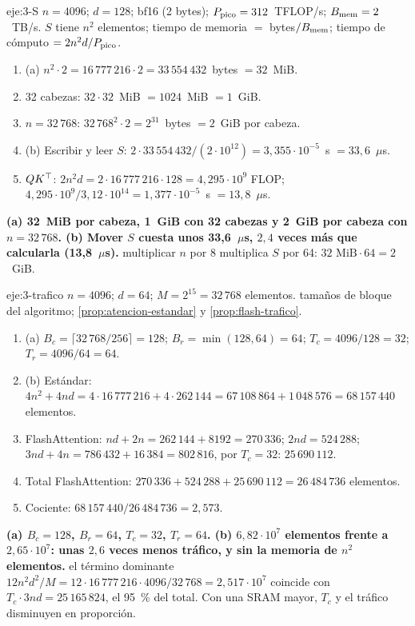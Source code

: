 \begin{solucion}{eje:3-S}
\datos $n=4096$; $d=128$; bf16 (2 bytes); $P_{\mathrm{pico}}=312$~TFLOP/s; $B_{\mathrm{mem}}=2$~TB/s.
\planteamiento $S$ tiene $n^{2}$ elementos; tiempo de memoria $=$ bytes$/B_{\mathrm{mem}}$; tiempo de cómputo $=2n^{2}d/P_{\mathrm{pico}}$.
\pasos
\begin{enumerate}[label=\arabic*.]
  \item (a) $n^{2}\cdot 2=16\,777\,216\cdot 2=33\,554\,432$~bytes $=32$~MiB.
  \item 32 cabezas: $32\cdot 32$~MiB $=1024$~MiB $=1$~GiB.
  \item $n=32\,768$: $32\,768^{2}\cdot 2=2^{31}$~bytes $=2$~GiB por cabeza.
  \item (b) Escribir y leer $S$: $2\cdot 33\,554\,432/(2\cdot 10^{12})=3{,}355\cdot 10^{-5}$~s $=33{,}6$~$\mu$s.
  \item $QK^{\top}$: $2n^{2}d=2\cdot 16\,777\,216\cdot 128=4{,}295\cdot 10^{9}$ FLOP; $4{,}295\cdot 10^{9}/3{,}12\cdot 10^{14}=1{,}377\cdot 10^{-5}$~s $=13{,}8$~$\mu$s.
\end{enumerate}
\resultado \textbf{(a) 32~MiB por cabeza, 1~GiB con 32 cabezas y 2~GiB por cabeza con $n=32\,768$. (b) Mover $S$ cuesta unos 33{,}6~$\mu$s, $2{,}4$ veces más que calcularla (13{,}8~$\mu$s).}
\comprobacion multiplicar $n$ por 8 multiplica $S$ por 64: $32\text{ MiB}\cdot 64=2$~GiB.
\end{solucion}

\begin{solucion}{eje:3-trafico}
\datos $n=4096$; $d=64$; $M=2^{15}=32\,768$ elementos.
\planteamiento tamaños de bloque del algoritmo; \cref{prop:atencion-estandar} y \cref{prop:flash-trafico}.
\pasos
\begin{enumerate}[label=\arabic*.]
  \item (a) $B_c=\lceil 32\,768/256\rceil=128$; $B_r=\min(128,64)=64$; $T_c=4096/128=32$; $T_r=4096/64=64$.
  \item (b) Estándar: $4n^{2}+4nd=4\cdot 16\,777\,216+4\cdot 262\,144=67\,108\,864+1\,048\,576=68\,157\,440$ elementos.
  \item FlashAttention: $nd+2n=262\,144+8192=270\,336$; $2nd=524\,288$; $3nd+4n=786\,432+16\,384=802\,816$, por $T_c=32$: $25\,690\,112$.
  \item Total FlashAttention: $270\,336+524\,288+25\,690\,112=26\,484\,736$ elementos.
  \item Cociente: $68\,157\,440/26\,484\,736=2{,}573$.
\end{enumerate}
\resultado \textbf{(a) $B_c=128$, $B_r=64$, $T_c=32$, $T_r=64$. (b) $6{,}82\cdot 10^{7}$ elementos frente a $2{,}65\cdot 10^{7}$: unas $2{,}6$ veces menos tráfico, y sin la memoria de $n^{2}$ elementos.}
\comprobacion el término dominante $12n^{2}d^{2}/M=12\cdot 16\,777\,216\cdot 4096/32\,768=2{,}517\cdot 10^{7}$ coincide con $T_c\cdot 3nd=25\,165\,824$, el 95~\% del total. Con una SRAM mayor, $T_c$ y el tráfico disminuyen en proporción.
\end{solucion}


